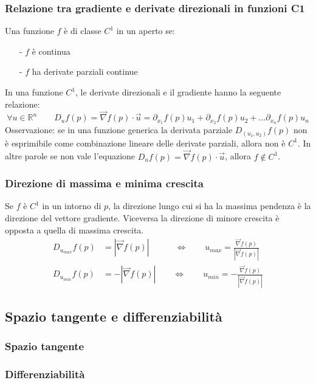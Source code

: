 \documentclass[a4paper]{article}
\newcommand\Rn{\mathbb{R}^n}  %
\begin{document}
\subsubsection*{Relazione tra gradiente e derivate direzionali in funzioni C1}
Una funzione \(f\) è di classe \(C^1\) in un aperto se:
\begin{itemize}[topsep=3pt, itemsep=0pt]
	\item[-] \(f\) è continua
	\item[-] \(f\) ha derivate parziali continue
\end{itemize}
In una funzione \(C^1\), le derivate direzionali e il gradiente hanno la seguente relazione:
\[\forall u \in \Rn \qquad D_u f(p) = \vec{\nabla} f(p) \cdot \vec{u} = \partial_{x_1} f(p) u_1 + \partial_{x_2} f(p) u_2 + \dots \partial_{x_n} f(p) u_n\]
Osservazione: se in una funzione generica la derivata parziale \(D_{(u_1, u_2)} f(p)\) non è esprimibile come combinazione
lineare delle derivate parziali, allora non è \(C^1\). In altre parole se non vale l'equazione \(D_u f(p) = \vec{\nabla} f(p) \cdot \vec{u}\), allora \(f \notin C^1\).

\subsubsection*{Direzione di massima e minima crescita}
Se \(f\) è \(C^1\) in un intorno di \(p\), la direzione lungo cui si ha la massima pendenza è la direzione del vettore gradiente.
Viceversa la direzione di minore crescita è opposta a quella di massima crescita.
\begin{align*}
	D_{u_{max}} f(p) &= \left| \vec{\nabla} f(p)\right| \qquad \quad \Leftrightarrow \qquad u_{max} = \frac{\vec{\nabla} f(p)}{\left| \vec{\nabla} f(p) \right|} \\
	D_{u_{min}} f(p) &= -\left| \vec{\nabla} f(p)\right| \qquad \Leftrightarrow \qquad u_{min} = -\frac{\vec{\nabla} f(p)}{\left| \vec{\nabla} f(p) \right|}
\end{align*}

\subsection{Spazio tangente e differenziabilità}
\subsubsection*{Spazio tangente}
\subsubsection*{Differenziabilità}
\end{document}
